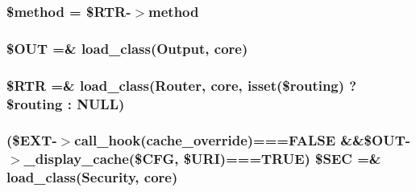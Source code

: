 \subsubsection[{\$method}]{\setlength{\rightskip}{0pt plus 5cm}\$method = \$R\+T\+R-\/$>$method}\label{_admin_2system_2core_2_code_igniter_8php_a12661b2fc0f57f97e30a1620889ce9c6}
\hypertarget{_admin_2system_2core_2_code_igniter_8php_ad437402616c81c82c746f09854b23729}{}
\subsubsection[{\$\+O\+U\+T}]{\setlength{\rightskip}{0pt plus 5cm}\$O\+U\+T =\& load\+\_\+class(\textquotesingle{}Output\textquotesingle{}, \textquotesingle{}core\textquotesingle{})}\label{_admin_2system_2core_2_code_igniter_8php_ad437402616c81c82c746f09854b23729}
\hypertarget{_admin_2system_2core_2_code_igniter_8php_a4d6c9285c8483e4708a57a4128fc95f3}{}
\subsubsection[{\$\+R\+T\+R}]{\setlength{\rightskip}{0pt plus 5cm}\$R\+T\+R =\& load\+\_\+class(\textquotesingle{}Router\textquotesingle{}, \textquotesingle{}core\textquotesingle{}, isset(\$routing) ? \$routing \+: N\+U\+L\+L)}\label{_admin_2system_2core_2_code_igniter_8php_a4d6c9285c8483e4708a57a4128fc95f3}
\hypertarget{_admin_2system_2core_2_code_igniter_8php_af78ce53fb82103e1165678dd2d3385a4}{}
\subsubsection[{\$\+S\+E\+C}]{ (\$E\+X\+T-\/$>$call\+\_\+hook(\textquotesingle{}cache\+\_\+override\textquotesingle{})===F\+A\+L\+S\+E \&\&\$O\+U\+T-\/$>$\+\_\+display\+\_\+cache(\$C\+F\+G, \$U\+R\+I)===T\+R\+U\+E) \$S\+E\+C =\& load\+\_\+class(\textquotesingle{}Security\textquotesingle{}, \textquotesingle{}core\textquotesingle{})}\label{_admin_2system_2core_2_code_igniter_8php_af78ce53fb82103e1165678dd2d3385a4}
\hypertarget{_admin_2system_2core_2_code_igniter_8php_a2060dabd8d00b5b0539bd041bf450924}{}
